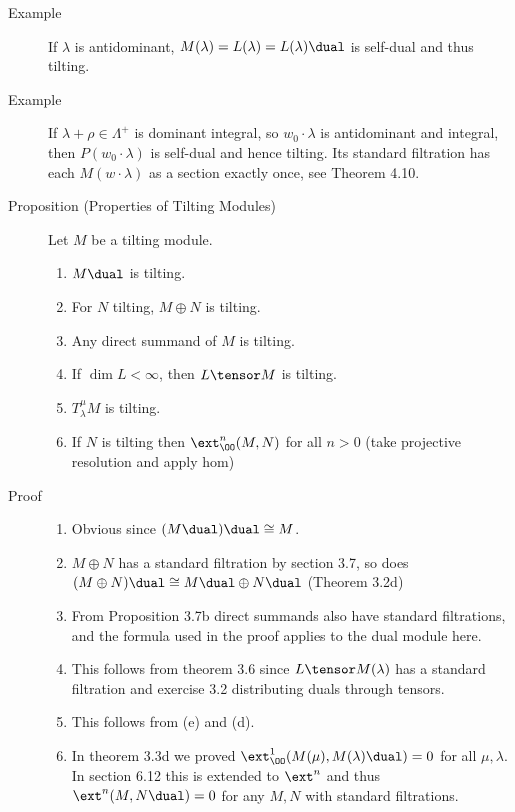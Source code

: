 \begin{description}
\item[Example]
If \(\lambda\) is antidominant,
\(M(\lambda) = L(\lambda) = L(\lambda)\dual\) is self-dual and thus
tilting.
\item[Example]
If \(\lambda + \rho \in \Lambda^+\) is dominant integral, so
\(w_0 \cdot \lambda\) is antidominant and integral, then
\(P(w_0 \cdot \lambda)\) is self-dual and hence tilting. Its standard
filtration has each \(M(w\cdot \lambda)\) as a section exactly once, see
Theorem 4.10.
\item[Proposition (Properties of Tilting Modules)]
Let \(M\) be a tilting module.

\begin{enumerate}
\def\labelenumi{\alph{enumi}.}
\tightlist
\item
  \(M\dual\) is tilting.
\item
  For \(N\) tilting, \(M \oplus N\) is tilting.
\item
  Any direct summand of \(M\) is tilting.
\item
  If \(\dim L < \infty\), then \(L \tensor M\) is tilting.
\item
  \(T_\lambda^\mu M\) is tilting.
\item
  If \(N\) is tilting then \(\ext_\OO^n(M, N)\) for all \(n>0\) (take
  projective resolution and apply hom)
\end{enumerate}
\item[Proof]
\hfill

\begin{enumerate}
\def\labelenumi{\alph{enumi}.}
\tightlist
\item
  Obvious since \((M\dual)\dual \cong M\).
\item
  \(M\oplus N\) has a standard filtration by section 3.7, so does
  \((M\oplus N)\dual \cong M\dual \oplus N\dual\) (Theorem 3.2d)
\item
  From Proposition 3.7b direct summands also have standard filtrations,
  and the formula used in the proof applies to the dual module here.
\item
  This follows from theorem 3.6 since \(L \tensor M(\lambda)\) has a
  standard filtration and exercise 3.2 distributing duals through
  tensors.
\item
  This follows from (e) and (d).
\item
  In theorem 3.3d we proved \(\ext_\OO^1 (M(\mu), M(\lambda)\dual) = 0\)
  for all \(\mu, \lambda\). In section 6.12 this is extended to
  \(\ext^n\) and thus \(\ext^n(M, N\dual) = 0\) for any \(M, N\) with
  standard filtrations.
\end{enumerate}
\end{description}

